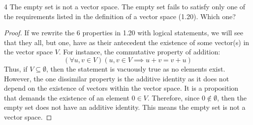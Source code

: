 \documentclass[12pt]{article}
\newenvironment{problem}[1]{\begin{prob*}{#1}{}}{\end{prob*}}
\begin{document}
    \begin{problem}{4}
        The empty set is not a vector space. The empty set fails to satisfy only one of the requirements listed in the definition of a vector space (1.20). Which one?
    \end{problem}
    \begin{proof}
    If we rewrite the 6 properties in 1.20 with logical statements, we will see that they all, but one, have as their antecedent the existence of some vector(s) in the vector space $V$. For instance, the commutative property of addition:
    \[(\forall u,v\in V)(u,v\in V \implies u+v=v+u)\]
    Thus, if $V\subseteq\emptyset$, then the statement is vacuously true as no elements exist.
    However, the one dissimilar property is the additive identity as it does not depend on the existence of vectors within the vector space. It is a proposition that demands the existence of an element $0\in V$. Therefore, since $0\notin \emptyset$, then the empty set does not have an additive identity. This means the empty set is not a vector space.
    \end{proof}
        
\end{document}
